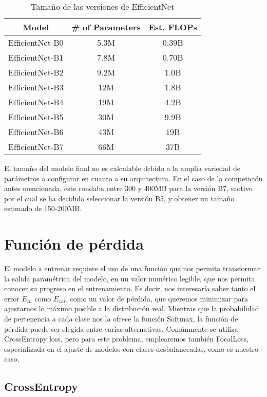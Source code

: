 \begin{table}[!ht]
	\centering
	\begin{tabular}{|c|c|c|}
		\hline
		\textbf{Model} & \textbf{\# of Parameters} & \textbf{Est. FLOPs} \\ \hline
		EfficientNet-B0 & 5.3M & 0.39B \\ \hline
		EfficientNet-B1 & 7.8M & 0.70B \\ \hline
		EfficientNet-B2 & 9.2M & 1.0B \\ \hline
		EfficientNet-B3 & 12M & 1.8B \\ \hline
		EfficientNet-B4 & 19M & 4.2B \\ \hline
		EfficientNet-B5 & 30M & 9.9B \\ \hline
		EfficientNet-B6 & 43M & 19B \\ \hline
		EfficientNet-B7 & 66M & 37B \\ \hline
	\end{tabular}
	\caption{Tamaño de las versiones de EfficientNet \cite{tan2020efficientnet}}
\end{table}

El tamaño del modelo final no es calculable debido a la amplia variedad de parámetros a configurar en cuanto a su arquitectura. En el caso de la competición antes mencionada, este rondaba entre 300 y 400MB para la versión B7, motivo por el cual se ha decidido seleccionar la versión B5, y obtener un tamaño estimado de 150-200MB.

\section{Función de pérdida}

El modelo a entrenar requiere el uso de una función que nos permita transformar la salida paramétrica del modelo, en un valor numérico legible, que nos permita conocer su progreso en el entrenamiento.  Es decir, nos interesaría saber tanto el error $E_{in}$ como $E_{val}$, como un valor de pérdida, que queremos minimizar para ajustarnos lo máximo posible a la distribución real. Mientras que la probabilidad de pertenencia a cada clase nos la ofrece la función Softmax, la función de pérdida puede ser elegida entre varias alternativas. Comúnmente se utiliza CrossEntropy loss, pero para este problema, emplearemos también FocalLoss, especializada en el ajuste de modelos con clases desbalanceadas, como es nuestro caso.

\subsection{CrossEntropy}

